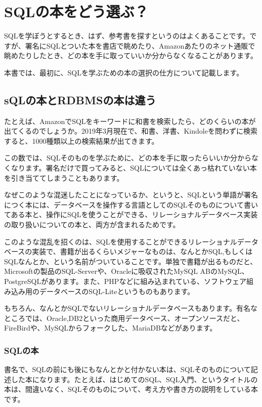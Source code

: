 \chapter{SQLの本をどう選ぶ？}

SQLを学ぼうとするとき、はず、参考書を探すというのはよくあることです。ですが、署名にSQLとついた本を書店で眺めたり、Amazonあたりのネット通販で眺めたりしたとき、どの本を手に取っていいか分からなくなることがあります。

本書では、最初に、SQLを学ぶための本の選択の仕方について記載します。

\section{sQLの本とRDBMSの本は違う}

たとえば、AmazonでSQLをキーワードに和書を検索したら、どのくらいの本が出てくるのでしょうか。2019年3月現在で、和書、洋書、Kindoleを問わずに検索すると、1000種類以上の検索結果が出てきます。

この数では、SQLそのものを学ぶために、どの本を手に取ったらいいか分からなくなります。署名だけで買ってみると、SQLについては全くあっ枯れていない本を引き当ててしまうこともあります。

なぜこのような混迷したことになっているか、というと、SQLという単語が署名につく本には、データベースを操作する言語としてのSQLそのものについて書いてある本と、操作にSQLを使うことができる、リレーショナルデータベース実装の取り扱いについての本と、両方が含まれるためです。

このような混乱を招くのは、SQLを使用することができるリレーショナルデータベースの実装で、書籍が出るくらいメジャーなものは、なんとかSQL,もしくはSQLなんとか、という名前がついていることです。単独で書籍が出るものだと、Microsoftの製品のSQL-Serverや、Oracleに吸収されたMySQL ABのMySQL、PostgreSQLがあります。また、PHPなどに組み込まれている、ソフトウェア組み込み用のデータベースのSQL-Liteというものもあります。

もちろん、なんとかSQLでないリレーショナルデータベースもあります。有名なところでは、Oracle,DB2といった商用データベース、オープンソースだと、FireBirdや、MySQLからフォークした、MariaDBなどがあります。

\subsection{SQLの本}

書名で、SQLの前にも後にもなんとかと付かない本は、SQLそのものについて記述した本になります。たとえば、はじめてのSQL、SQL入門、というタイトルの本は、間違いなく、SQLそのものについて、考え方や書き方の説明をしている本です。

